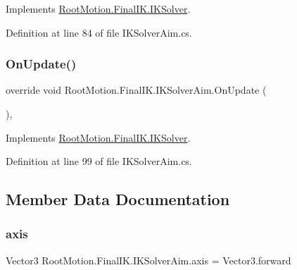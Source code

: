 Implements \mbox{\hyperlink{class_root_motion_1_1_final_i_k_1_1_i_k_solver_a2a8cbf1dfed274fdbc79ff011c468cc6}{Root\+Motion.\+Final\+I\+K.\+I\+K\+Solver}}.



Definition at line 84 of file I\+K\+Solver\+Aim.\+cs.

\mbox{\label{class_root_motion_1_1_final_i_k_1_1_i_k_solver_aim_a828674d8e72e508f17bd64a7404c430e}} 
\subsubsection{\texorpdfstring{On\+Update()}{OnUpdate()}}
{\footnotesize\ttfamily override void Root\+Motion.\+Final\+I\+K.\+I\+K\+Solver\+Aim.\+On\+Update (\begin{DoxyParamCaption}{ }\end{DoxyParamCaption})\hspace{0.3cm}{\ttfamily [protected]}, {\ttfamily [virtual]}}



Implements \mbox{\hyperlink{class_root_motion_1_1_final_i_k_1_1_i_k_solver_a3bbcc10c91d82ac266dadc63ea93171d}{Root\+Motion.\+Final\+I\+K.\+I\+K\+Solver}}.



Definition at line 99 of file I\+K\+Solver\+Aim.\+cs.



\subsection{Member Data Documentation}
\mbox{\label{class_root_motion_1_1_final_i_k_1_1_i_k_solver_aim_ac1ffdbd44a0254be3d72828bc0bd11df}} 
\subsubsection{\texorpdfstring{axis}{axis}}
{\footnotesize\ttfamily Vector3 Root\+Motion.\+Final\+I\+K.\+I\+K\+Solver\+Aim.\+axis = Vector3.\+forward}



